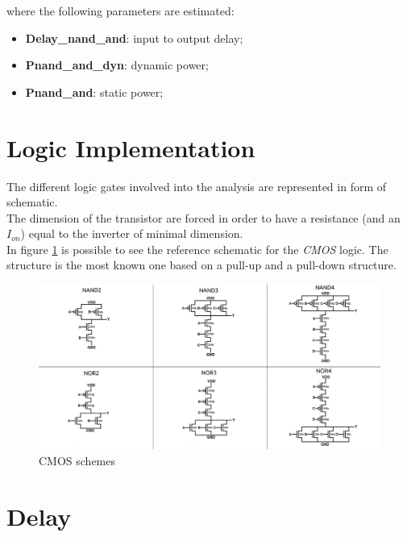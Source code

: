 \documentclass[12pt,  english, makeidx, a4paper, titlepage, oneside]{article}
\begin{document}
where the following parameters are estimated:

\begin{itemize}
\item \textbf{Delay\_nand\_and}: input to output delay;
\item \textbf{Pnand\_and\_dyn}: dynamic power;
\item \textbf{Pnand\_and}: static power;
\end{itemize}
 
\newpage 
\section{Logic Implementation}

\label{section:logicimplementation}
The different logic gates involved into the analysis are represented in form of schematic.\\
The dimension of the transistor are forced in order to have a resistance (and an $I_{on}$) equal to the inverter of minimal dimension.\\
In figure \ref{fig:CMOSGRID} is possible to see the reference schematic for the \textit{CMOS} logic. The structure is the most known one based on a pull-up and a pull-down structure.\\

\begin{figure}[htbp]
\begin{center}
\includegraphics[width=19cm]{img/CMOS_GRID.jpg}
\caption{CMOS schemes}
\label{fig:CMOSGRID}
\end{center}
\end{figure}
\newpage




\section{Delay}
\end{document}
